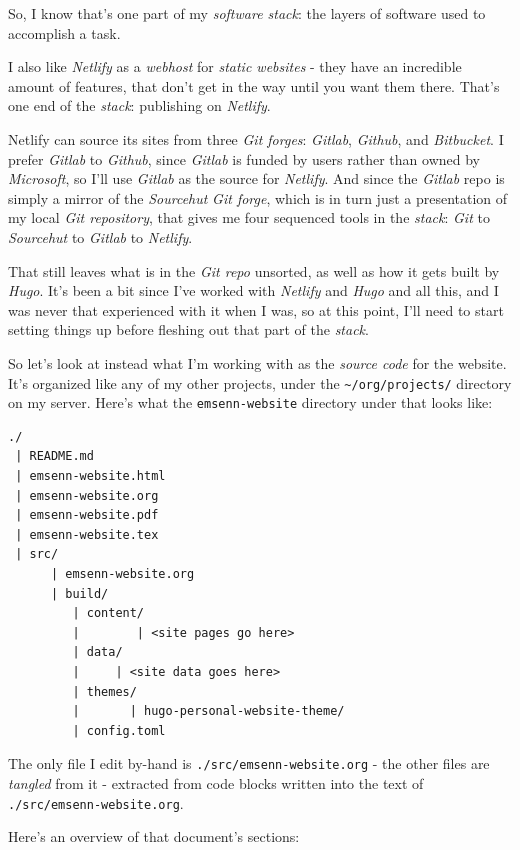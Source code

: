 \documentclass[11pt]{article}
\begin{document}
So, I know that's one part of my \emph{software stack}: the layers of
software used to accomplish a task.

I also like \emph{Netlify} as a \emph{webhost} for \emph{static websites} - they have
an incredible amount of features, that don't get in the way until you
want them there. That's one end of the \emph{stack}: publishing on
\emph{Netlify}.

Netlify can source its sites from three \emph{Git forges}: \emph{Gitlab},
\emph{Github}, and \emph{Bitbucket}. I prefer \emph{Gitlab} to \emph{Github}, since
\emph{Gitlab} is funded by users rather than owned by \emph{Microsoft}, so I'll
use \emph{Gitlab} as the source for \emph{Netlify}. And since the \emph{Gitlab} repo
is simply a mirror of the \emph{Sourcehut} \emph{Git forge}, which is in turn
just a presentation of my local \emph{Git repository}, that gives me four
sequenced tools in the \emph{stack}: \emph{Git} to \emph{Sourcehut} to \emph{Gitlab} to
\emph{Netlify}.

That still leaves what is in the \emph{Git repo} unsorted, as well as how
it gets built by \emph{Hugo}. It's been a bit since I've worked with
\emph{Netlify} and \emph{Hugo} and all this, and I was never that experienced
with it when I was, so at this point,  I'll need to start setting
things up before fleshing out that part of the \emph{stack}.

So let's look at instead what I'm working with as the \emph{source code}
for the website. It's organized like any of my other projects, under
the \texttt{\textasciitilde{}/org/projects/} directory on my server. Here's what the
\texttt{emsenn-website} directory under that looks like:

\begin{verbatim}
./
 | README.md
 | emsenn-website.html
 | emsenn-website.org
 | emsenn-website.pdf
 | emsenn-website.tex
 | src/
      | emsenn-website.org
      | build/
	     | content/
	     |        | <site pages go here>
	     | data/
	     |     | <site data goes here>
	     | themes/
	     |       | hugo-personal-website-theme/
	     | config.toml
\end{verbatim}

The only file I edit by-hand is \texttt{./src/emsenn-website.org} - the other
files are \emph{tangled} from it - extracted from code blocks written into
the text of \texttt{./src/emsenn-website.org}.

Here's an overview of that document's sections:
\end{document}
